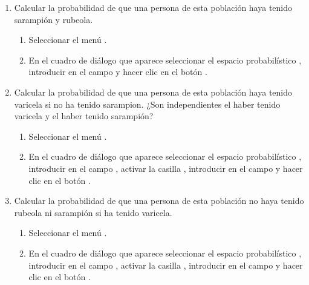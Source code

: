 \begin{enumerate}[leftmargin=*]
\begin{enumerate}
\item Calcular la probabilidad de que una persona de esta población haya tenido sarampión y rubeola. 
\begin{indicacion}
\begin{enumerate}
\item Seleccionar el menú .
\item En el cuadro de diálogo que aparece seleccionar el espacio probabilístico , introducir
 en el campo  y hacer clic en el botón .
\end{enumerate}
\end{indicacion} 

\item Calcular la probabilidad de que una persona de esta población haya tenido varicela si no ha tenido sarampion.
¿Son independientes el haber tenido varicela y el haber tenido sarampión? 
\begin{indicacion}
\begin{enumerate}
\item Seleccionar el menú .
\item En el cuadro de diálogo que aparece seleccionar el espacio probabilístico , introducir
 en el campo , activar la casilla , introducir  en el campo  y hacer clic en el botón .
\end{enumerate}
\end{indicacion} 

\item Calcular la probabilidad de que una persona de esta población no haya tenido rubeola ni sarampión si ha tenido varicela. 
\begin{indicacion}
\begin{enumerate}
\item Seleccionar el menú .
\item En el cuadro de diálogo que aparece seleccionar el espacio probabilístico , introducir
 en el campo , activar la casilla , introducir
 en el campo  y hacer clic en el botón .
\end{enumerate}
\end{indicacion} 
\end{enumerate}


\end{enumerate}
